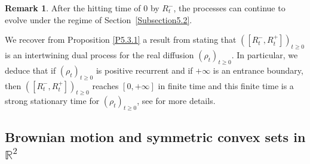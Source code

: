 \documentclass[JEP,XML,SOM,Unicode,NoFloatCountersInSection,published]{cedram}
\theoremstyle{plain}
\theoremstyle{definition}
\newtheorem{remark}[thm]{Remark}
\newcommand{\RR}{{\mathbb R}}
\let\iy\infty
\begin{document}
\begin{remark}
\label{R5.3.1}
After the hitting time of $0$ by $R_t^-$, the processes can continue to evolve under the regime of Section~\ref{Subsection5.2}.
\end{remark}

We recover from Proposition \ref{P5.3.1} a result from \cite{MR3634282} stating that $([R^-_t,R^+_t])_{t\geq 0}$ is an intertwining dual process for the real diffusion $(\rho_t)_{t\geq 0}$.
In particular, we deduce that if $(\rho_t)_{t\geq 0}$ is positive recurrent and if $+\iy$ is an entrance boundary, then $([R^-_t,R^+_t])_{t\geq 0}$ reaches $[0,+\iy]$ in finite time and this finite time is a strong stationary time for $(\rho_t)_{t\geq 0}$, see \cite{MR3634282} for more details.

\subsection{Brownian motion and symmetric convex sets in $\RR^2$}
\label{Subsection5.4}
\end{document}
